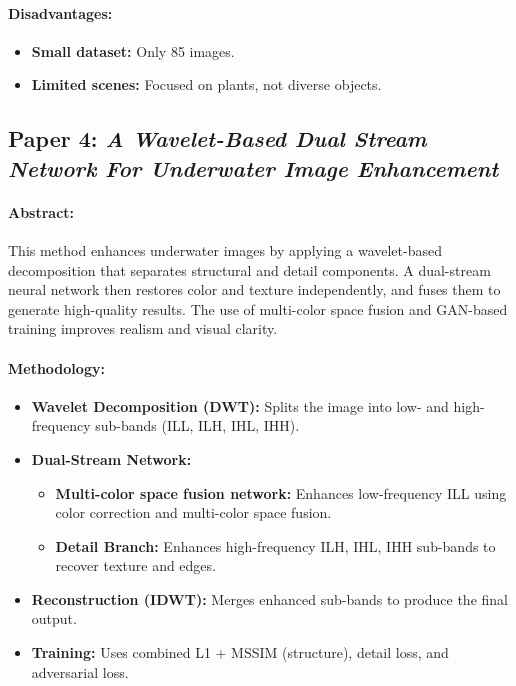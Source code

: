 \documentclass{article}
\begin{document}
\paragraph{Disadvantages:}
\begin{itemize}
    \item \textbf{Small dataset:} Only 85 images.
    \item \textbf{Limited scenes:} Focused on plants, not diverse objects.
\end{itemize}

\subsection{Paper 4: \textit{A Wavelet-Based Dual 
Stream Network For Underwater Image Enhancement}}

\paragraph{Abstract:}  
This method enhances underwater images by applying a wavelet-based decomposition that separates structural and detail components. A dual-stream neural network then restores color and texture independently, and fuses them to generate high-quality results. The use of multi-color space fusion and GAN-based training improves realism and visual clarity.

\paragraph{Methodology:}
\begin{itemize}
    \item  \textbf{Wavelet Decomposition (DWT):} Splits the image into low- and high-frequency sub-bands (ILL, ILH, IHL, IHH).
    \item \textbf{Dual-Stream Network:}
        \begin{itemize}
            \item \textbf{Multi-color space fusion network:}  Enhances low-frequency ILL using color correction and multi-color space fusion.
            \item \textbf{Detail Branch:} Enhances high-frequency ILH, IHL, IHH sub-bands to recover texture and edges.
        \end{itemize}
    \item \textbf{Reconstruction (IDWT):} Merges enhanced sub-bands to produce the final output.
    \item \textbf{Training:} Uses combined L1 + MSSIM (structure), detail loss, and adversarial loss.
\end{itemize}
\end{document}
